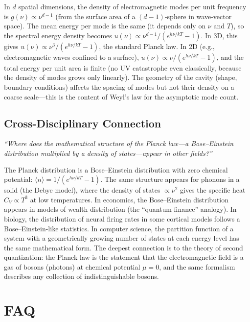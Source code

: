 \documentclass[11pt,openright]{book}
\begin{document}
In $d$ spatial dimensions, the density of electromagnetic modes per unit frequency is $g(\nu) \propto \nu^{d-1}$ (from the surface area of a $(d-1)$-sphere in wave-vector space). The mean energy per mode is the same (it depends only on $\nu$ and $T$), so the spectral energy density becomes $u(\nu) \propto \nu^{d-1}/(e^{h\nu/kT} - 1)$. In 3D, this gives $u(\nu) \propto \nu^{3}/(e^{h\nu/kT} - 1)$, the standard Planck law. In 2D (e.g., electromagnetic waves confined to a surface), $u(\nu) \propto \nu/(e^{h\nu/kT} - 1)$, and the total energy per unit area is finite (no UV catastrophe even classically, because the density of modes grows only linearly). The geometry of the cavity (shape, boundary conditions) affects the spacing of modes but not their density on a coarse scale---this is the content of Weyl's law for the asymptotic mode count.

\subsection*{Cross-Disciplinary Connection}
\textit{``Where does the mathematical structure of the Planck law---a Bose--Einstein distribution multiplied by a density of states---appear in other fields?''}

The Planck distribution is a Bose--Einstein distribution with zero chemical potential: $\langle n\rangle = 1/(e^{h\nu/kT} - 1)$. The same structure appears for phonons in a solid (the Debye model), where the density of states $\propto \nu^{2}$ gives the specific heat $C_{V} \propto T^{3}$ at low temperatures. In economics, the Bose--Einstein distribution appears in models of wealth distribution (the ``quantum finance'' analogy). In biology, the distribution of neural firing rates in some cortical models follows a Bose--Einstein-like statistics. In computer science, the partition function of a system with a geometrically growing number of states at each energy level has the same mathematical form. The deepest connection is to the theory of second quantization: the Planck law is the statement that the electromagnetic field is a gas of bosons (photons) at chemical potential $\mu = 0$, and the same formalism describes any collection of indistinguishable bosons.

\section*{FAQ}
\end{document}
